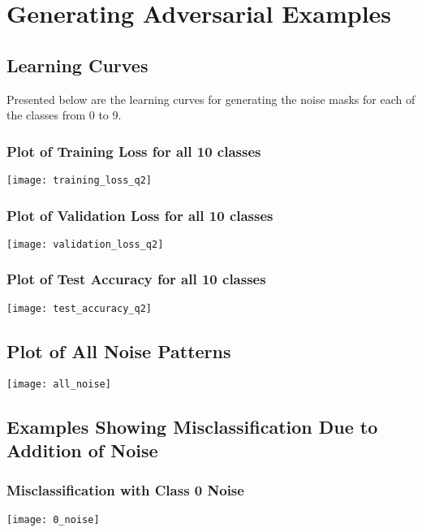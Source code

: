 \documentclass[a4paper]{article}
\begin{document}
\section{Generating Adversarial Examples}
\subsection{Learning Curves}
Presented below are the learning curves for generating the noise masks for each of the classes from 0 to 9. 
\subsubsection{Plot of Training Loss for all 10 classes}
\begin{center}
\texttt{[image: training\_loss\_q2]}
\end{center}
\subsubsection{Plot of Validation Loss for all 10 classes}
\begin{center}
\texttt{[image: validation\_loss\_q2]}
\end{center}
\subsubsection{Plot of Test Accuracy for all 10 classes}
\begin{center}
\texttt{[image: test\_accuracy\_q2]}
\end{center}


\subsection{Plot of All Noise Patterns}
\begin{center}
\texttt{[image: all\_noise]}
\end{center}

\subsection{Examples Showing Misclassification Due to Addition of Noise}
\subsubsection{Misclassification with Class 0 Noise}
\begin{center}
\texttt{[image: 0\_noise]}
\end{center}
\end{document}
